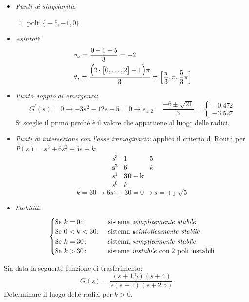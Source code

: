 \begin{itemize}
	\item \emph{Punti di singolarità}:
		\begin{itemize}
			\item poli: \(\bigl\{ -5, -1, 0 \bigr\}\)
		\end{itemize}
	\item \emph{Asintoti}:
		\begin{align*}
			& \sigma_a = \frac{0-1-5}{3} = -2 \\
			& \theta_a = \frac{\Bigl( 2 \cdot \bigl[ 0, \dots, 2 \bigr] +1 \Bigr) \pi}{3} = \Bigl[ \frac{\pi}{3}, \pi, \frac{5}{3}\pi \Bigr]
		\end{align*}
	\item \emph{Punto doppio di emergenza}:
		\[
			G^\prime (s) = 0 \rightarrow -3s^2 -12s -5=0 \rightarrow s_{1,2} = \frac{-6\pm\sqrt{21}}{3} = \begin{cases} \bm{-0.472} \\ -3.527 \end{cases}
		\]
		Si sceglie il primo perché è il valore che appartiene al luogo delle radici.
	\item \emph{Punti di intersezione con l'asse immaginario}:
		applico il criterio di Routh per \(P(s) = s^3 +6s^2 +5s +k\):
		\[\begin{array}{r|rr}
			s^3      & 1 & 5 \\
			\bm{s^2} & 6 & k \\
			s^1      & \bm{30-k} \\
			s^0      & k
		\end{array}\]
		\[
			k = 30 \rightarrow 6s^2+30 = 0 \rightarrow s = \pm \jmath \sqrt{5}
		\]
	\item \emph{Stabilità}:
		\[\begin{cases}
			\text{Se } k = 0\colon & \text{sistema \emph{semplicemente stabile}} \\
			\text{Se } 0 < k < 30\colon & \text{sistema \emph{asintoticamente stabile}} \\
			\text{Se } k = 30\colon & \text{sistema \emph{semplicemente stabile}} \\
			\text{Se } k > 30\colon & \text{sistema \emph{instabile} con 2 poli instabili}
		\end{cases}\]
\end{itemize}


\exercise{}
Sia data la seguente funzione di trasferimento:
\[
	G(s) = \frac{(s+1.5)(s+4)}{s(s+1)(s+2.5)}
\]
Determinare il luogo delle radici per \(k>0\).

